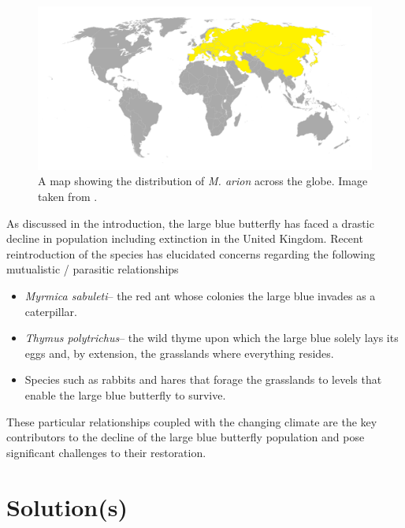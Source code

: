\documentclass[12pt, twocolumn, letterpaper]{article}
\begin{document}
\begin{figure}[!hbt]
	\centering
	\includegraphics[width=1\columnwidth]{distribution}
	\caption{A map showing the distribution of \textit{M. arion} across the globe. Image taken from \cite{noauthor_large_2018}.} 
	\label{fig:distribution}
\end{figure}

As discussed in the introduction, the large blue butterfly has faced a drastic decline in population including extinction in the United Kingdom. Recent reintroduction of the species has elucidated concerns regarding the following mutualistic / parasitic relationships 
\begin{itemize}
	\item \textit{Myrmica sabuleti}-- the red ant whose colonies the large blue invades as a caterpillar.
	\item \textit{Thymus polytrichus}-- the wild thyme upon which the large blue solely lays its eggs and, by extension, the grasslands where everything resides. 
	\item Species such as rabbits and hares that forage the grasslands to levels that enable the large blue butterfly to survive. 
\end{itemize}

These particular relationships coupled with the changing climate are the key contributors to the decline of the large blue butterfly population and pose significant challenges to their restoration. 

\section*{Solution(s)}  
\end{document}
